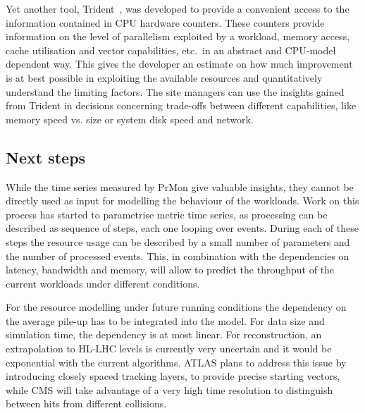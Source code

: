 Yet another tool, Trident~\cite{trident}, was developed to provide a
convenient access to the information contained in CPU hardware
counters.  These counters provide information on the level of
parallelism exploited by a workload, memory access, cache utilisation
and vector capabilities, etc.~in an abstract and CPU-model dependent
way.  This gives the developer an estimate on how much improvement is
at best possible in exploiting the available resources and
quantitatively understand the limiting factors. The site managers can
use the insights gained from Trident in decisions concerning
trade-offs between different capabilities, like memory speed vs. size
or system disk speed and network.

\subsection{Next steps}
While the time series measured by PrMon give valuable insights, they
cannot be directly used as input for modelling the behaviour of the
workloads. Work on this process has started to parametrise metric time
series, as processing can be described as sequence of steps, each one
looping over events. During each of these steps the resource usage can
be described by a small number of parameters and the number of
processed events. This, in combination with the dependencies on
latency, bandwidth and memory, will allow to predict the throughput of
the current workloads under different conditions.

For the resource modelling under future running conditions the
dependency on the average pile-up has to be integrated into the
model. For data size and simulation time, the dependency is at most
linear. For reconstruction, an extrapolation to HL-LHC levels is
currently very uncertain and it would be exponential with the current
algorithms. ATLAS plans to address this issue by introducing closely
spaced tracking layers, to provide precise starting vectors, while CMS
will take advantage of a very high time resolution to distinguish
between hits from different collisions.
